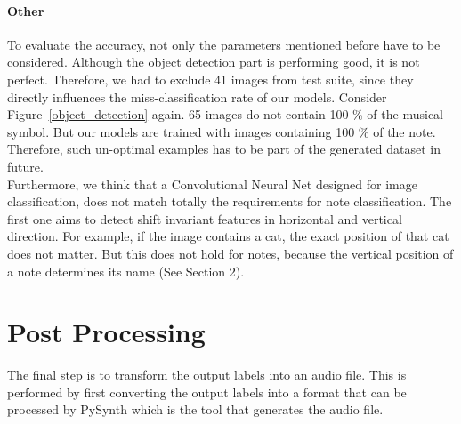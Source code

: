 \documentclass[twocolumn]{article}
\begin{document}
\paragraph{Other}
To evaluate the accuracy, not only the parameters mentioned before have to be considered. Although the object detection part is performing good, it is not perfect. Therefore, we had to exclude 41 images from test suite, since they directly influences the miss-classification rate of our models. Consider Figure~\ref{object_detection} again. 65 images do not contain 100 \% of the musical symbol. But our models are trained with images containing 100 \% of the note. Therefore, such un-optimal examples has to be part of the generated dataset in future. \\
Furthermore, we think that a Convolutional Neural Net designed for image classification, does not match totally the requirements for note classification. The first one aims to detect shift invariant features in horizontal and vertical direction. For example, if the image contains a cat, the exact position of that cat does not matter. But this does not hold for notes, because the vertical position of a note determines its name (See Section 2).  


\section{Post Processing}
The final step is to transform the output labels into an audio file. This is performed by first converting the output labels into a format that can be processed by PySynth \cite{pysynth} which is the tool that generates the audio file.


  
\end{document}
